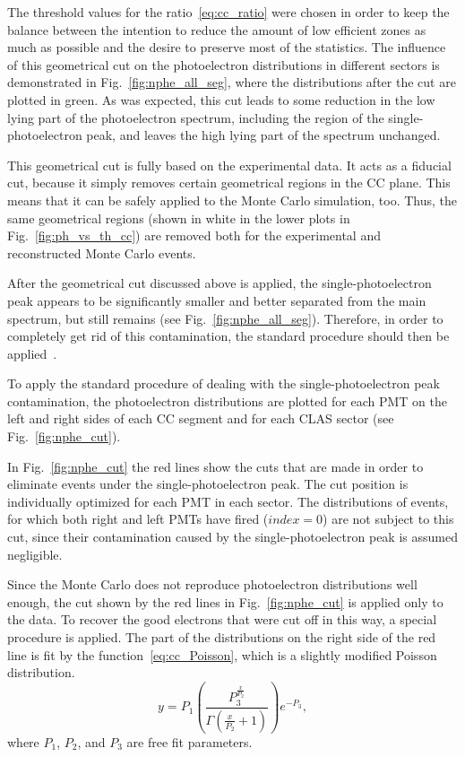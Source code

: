 The threshold values for the ratio~\eqref{eq:cc_ratio} were chosen in order to keep the balance between the intention to reduce the amount of low efficient zones as much as possible and the desire to preserve most of the statistics. The influence of this geometrical cut on the photoelectron distributions in different sectors is demonstrated in Fig.~\ref{fig:nphe_all_seg}, where the distributions after the cut are plotted in green. As was expected, this cut leads to some reduction in the low lying part of the photoelectron spectrum, including the region of the single-photoelectron peak, and leaves the high lying part of the spectrum unchanged.


This geometrical cut is fully based on the experimental data. It acts as a fiducial cut, because it simply removes certain geometrical regions in the CC plane. This means that it can be safely applied to the Monte Carlo simulation, too. Thus, the same geometrical regions (shown in white in the lower plots in Fig.~\ref{fig:ph_vs_th_cc}) are removed both for the experimental and reconstructed Monte Carlo events.


After the geometrical cut discussed above is applied, the single-photoelectron peak appears to be significantly smaller and better separated from the main spectrum, but still remains (see Fig.~\ref{fig:nphe_all_seg}). Therefore, in order to completely get rid of this contamination, the standard procedure should then be applied~\cite{Fed_an_note:2007}. 


To apply the standard procedure of dealing with the single-photoelectron peak contamination, the photoelectron distributions are plotted for each PMT on the left and right sides of each CC segment and for each CLAS sector (see Fig.~\ref{fig:nphe_cut}). 


In Fig.~\ref{fig:nphe_cut} the red lines show the cuts that are made in order to eliminate events under the single-photoelectron peak. The cut position is individually optimized for each PMT in each sector. The distributions of events, for which both right and left PMTs have fired ($index = 0$) are not subject to this cut, since their contamination caused by the single-photoelectron peak is assumed negligible.


Since the Monte Carlo does not reproduce photoelectron distributions well enough, the cut shown by the red lines in Fig.~\ref{fig:nphe_cut} is applied only to the data. To recover the good electrons that were cut off in this way, a special procedure is applied. The part of the distributions on the right side of the red line is fit by the function~\eqref{eq:cc_Poisson}, which is a slightly modified Poisson distribution. 
\begin{equation}
y = P_{1}\left(\frac{P_{3}^{\frac{x}{P_{2}}}}{\Gamma\left(\frac{x}{P_{2}}+1\right)}
\right)e^{-P_{3}},
\label{eq:cc_Poisson}
\end{equation}
where $P_{1}$, $P_{2}$, and $P_{3}$ are free fit parameters.

